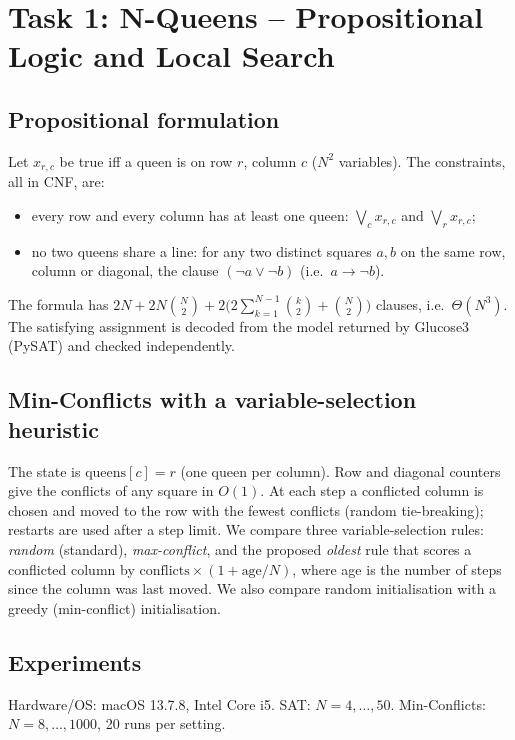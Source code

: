 \section{Task 1: N-Queens -- Propositional Logic and Local Search}

\subsection{Propositional formulation}
Let $x_{r,c}$ be true iff a queen is on row $r$, column $c$ ($N^2$ variables).
The constraints, all in CNF, are:
\begin{itemize}
  \item every row and every column has at least one queen: $\bigvee_{c} x_{r,c}$ and $\bigvee_{r} x_{r,c}$;
  \item no two queens share a line: for any two distinct squares $a,b$ on the same row,
        column or diagonal, the clause $(\neg a \lor \neg b)$ (i.e.\ $a \rightarrow \neg b$).
\end{itemize}
The formula has $2N + 2N\binom{N}{2} + 2\bigl(2\sum_{k=1}^{N-1}\binom{k}{2}+\binom{N}{2}\bigr)$
clauses, i.e.\ $\Theta(N^3)$. The satisfying assignment is decoded from the model returned by
Glucose3 (PySAT) and checked independently.

\subsection{Min-Conflicts with a variable-selection heuristic}
The state is $\text{queens}[c]=r$ (one queen per column). Row and diagonal counters give the
conflicts of any square in $O(1)$. At each step a conflicted column is chosen and moved to the row
with the fewest conflicts (random tie-breaking); restarts are used after a step limit.
We compare three variable-selection rules: \emph{random} (standard), \emph{max-conflict}, and the
proposed \emph{oldest} rule that scores a conflicted column by
$\text{conflicts}\times(1+\text{age}/N)$, where age is the number of steps since the column was last moved.
We also compare random initialisation with a greedy (min-conflict) initialisation.

\subsection{Experiments}
Hardware/OS: macOS 13.7.8, Intel Core i5. SAT: $N=4,\dots,50$. Min-Conflicts: $N=8,\dots,1000$, 20 runs per setting.


